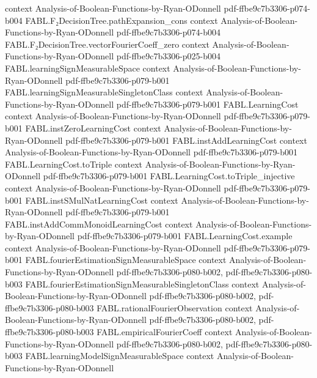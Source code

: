 \begin{theorem}
  {context}
  {Analysis-of-Boolean-Functions-by-Ryan-ODonnell}
  {pdf-ffbe9c7b3306-p074-b004}
\proofstep
  {FABL.F₂DecisionTree.pathExpansion_cons}
  {context}
  {Analysis-of-Boolean-Functions-by-Ryan-ODonnell}
  {pdf-ffbe9c7b3306-p074-b004}
\proofstep
  {FABL.F₂DecisionTree.vectorFourierCoeff_zero}
  {context}
  {Analysis-of-Boolean-Functions-by-Ryan-ODonnell}
  {pdf-ffbe9c7b3306-p025-b004}
\proofstep
  {FABL.learningSignMeasurableSpace}
  {context}
  {Analysis-of-Boolean-Functions-by-Ryan-ODonnell}
  {pdf-ffbe9c7b3306-p079-b001}
\proofstep
  {FABL.learningSignMeasurableSingletonClass}
  {context}
  {Analysis-of-Boolean-Functions-by-Ryan-ODonnell}
  {pdf-ffbe9c7b3306-p079-b001}
\proofstep
  {FABL.LearningCost}
  {context}
  {Analysis-of-Boolean-Functions-by-Ryan-ODonnell}
  {pdf-ffbe9c7b3306-p079-b001}
\proofstep
  {FABL.instZeroLearningCost}
  {context}
  {Analysis-of-Boolean-Functions-by-Ryan-ODonnell}
  {pdf-ffbe9c7b3306-p079-b001}
\proofstep
  {FABL.instAddLearningCost}
  {context}
  {Analysis-of-Boolean-Functions-by-Ryan-ODonnell}
  {pdf-ffbe9c7b3306-p079-b001}
\proofstep
  {FABL.LearningCost.toTriple}
  {context}
  {Analysis-of-Boolean-Functions-by-Ryan-ODonnell}
  {pdf-ffbe9c7b3306-p079-b001}
\proofstep
  {FABL.LearningCost.toTriple_injective}
  {context}
  {Analysis-of-Boolean-Functions-by-Ryan-ODonnell}
  {pdf-ffbe9c7b3306-p079-b001}
\proofstep
  {FABL.instSMulNatLearningCost}
  {context}
  {Analysis-of-Boolean-Functions-by-Ryan-ODonnell}
  {pdf-ffbe9c7b3306-p079-b001}
\proofstep
  {FABL.instAddCommMonoidLearningCost}
  {context}
  {Analysis-of-Boolean-Functions-by-Ryan-ODonnell}
  {pdf-ffbe9c7b3306-p079-b001}
\proofstep
  {FABL.LearningCost.example}
  {context}
  {Analysis-of-Boolean-Functions-by-Ryan-ODonnell}
  {pdf-ffbe9c7b3306-p079-b001}
\proofstep
  {FABL.fourierEstimationSignMeasurableSpace}
  {context}
  {Analysis-of-Boolean-Functions-by-Ryan-ODonnell}
  {pdf-ffbe9c7b3306-p080-b002,
    pdf-ffbe9c7b3306-p080-b003}
\proofstep
  {FABL.fourierEstimationSignMeasurableSingletonClass}
  {context}
  {Analysis-of-Boolean-Functions-by-Ryan-ODonnell}
  {pdf-ffbe9c7b3306-p080-b002,
    pdf-ffbe9c7b3306-p080-b003}
\proofstep
  {FABL.rationalFourierObservation}
  {context}
  {Analysis-of-Boolean-Functions-by-Ryan-ODonnell}
  {pdf-ffbe9c7b3306-p080-b002,
    pdf-ffbe9c7b3306-p080-b003}
\proofstep
  {FABL.empiricalFourierCoeff}
  {context}
  {Analysis-of-Boolean-Functions-by-Ryan-ODonnell}
  {pdf-ffbe9c7b3306-p080-b002,
    pdf-ffbe9c7b3306-p080-b003}
\proofstep
  {FABL.learningModelSignMeasurableSpace}
  {context}
  {Analysis-of-Boolean-Functions-by-Ryan-ODonnell}

\end{theorem}
